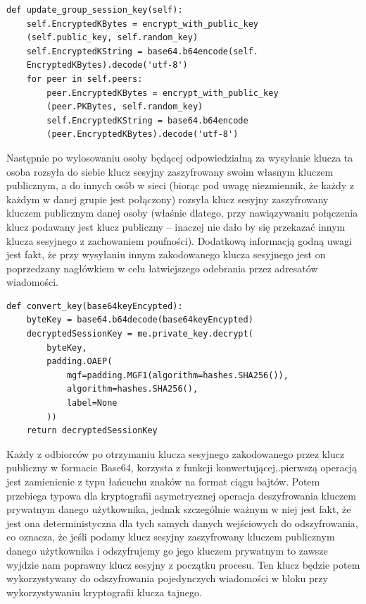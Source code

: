 \begin{lstlisting}[caption={Uaklualnienie klucza sesyjnego}]
def update_group_session_key(self):
    self.EncryptedKBytes = encrypt_with_public_key
    (self.public_key, self.random_key)
    self.EncryptedKString = base64.b64encode(self.
    EncryptedKBytes).decode('utf-8')
    for peer in self.peers:
        peer.EncryptedKBytes = encrypt_with_public_key
        (peer.PKBytes, self.random_key)
        self.EncryptedKString = base64.b64encode
        (peer.EncryptedKBytes).decode('utf-8')
\end{lstlisting}
Następnie po wylosowaniu osoby będącej odpowiedzialną za wysyłanie klucza ta osoba rozsyła do siebie klucz sesyjny zaszyfrowany swoim własnym kluczem publicznym, a do innych osób w sieci (biorąc pod uwagę niezmiennik, że każdy z każdym w danej grupie jest połączony) rozsyła klucz sesyjny zaszyfrowany kluczem publicznym danej osoby (właśnie dlatego, przy nawiązywaniu połączenia klucz podawany jest klucz publiczny – inaczej nie dało by się przekazać innym klucza sesyjnego z zachowaniem poufności). Dodatkową informacją godną uwagi jest fakt, że przy wysyłaniu innym zakodowanego klucza sesyjnego jest on poprzedzany nagłówkiem w celu łatwiejszego odebrania przez adresatów wiadomości.

\begin{lstlisting}[caption={Deszyfrowanie klucza sesyjnego}]
def convert_key(base64keyEncypted):
    byteKey = base64.b64decode(base64keyEncypted)
    decryptedSessionKey = me.private_key.decrypt(
        byteKey,
        padding.OAEP(
            mgf=padding.MGF1(algorithm=hashes.SHA256()),
            algorithm=hashes.SHA256(),
            label=None
        ))
    return decryptedSessionKey
\end{lstlisting}
Każdy z odbiorców po otrzymaniu klucza sesyjnego zakodowanego przez klucz publiczny w formacie Base64, korzysta z funkcji konwertującej,.pierwszą operacją jest zamienienie z typu łańcuchu znaków na format ciągu bajtów. Potem przebiega typowa dla kryptografii asymetrycznej operacja deszyfrowania kluczem prywatnym danego użytkownika, jednak szczególnie ważnym w niej jest fakt, że jest ona deterministyczna dla tych samych danych wejściowych do odszyfrowania, co oznacza, że jeśli podamy klucz sesyjny zaszyfrowany kluczem publicznym danego użytkownika i odszyfrujemy go jego kluczem prywatnym to zawsze wyjdzie nam poprawny klucz sesyjny z początku procesu. Ten klucz będzie potem wykorzystywany do odszyfrowania pojedynczych wiadomości w bloku przy wykorzystywaniu kryptografii klucza tajnego.

